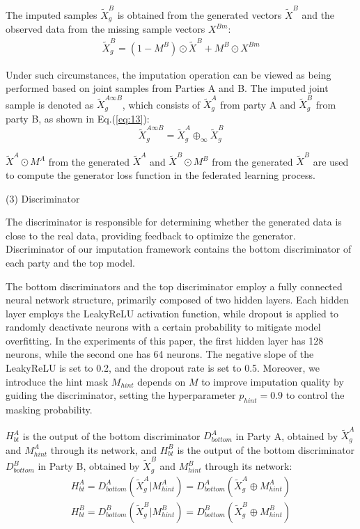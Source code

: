 \documentclass[final,1p,times]{elsarticle}
\begin{document}
The imputed samples $\tilde{X}_{g}^{B}$ is obtained from the generated vectors $\tilde{X}^B$  and the observed data from the missing sample vectors $X^{Bm}$:
\begin{equation}
	\begin{split}
	\tilde{X}_g^B=(1-M^B)\odot\tilde{X}^B+M^B\odot X^{Bm}
	\end{split}
\end{equation}

Under such circumstances, the imputation operation can be viewed as being performed based on joint samples from Parties A and B. The imputed joint sample is denoted as $\tilde{X}_{g}^{A\infty B}$, which consists of $\tilde{X}_g^A$ from party A and $\tilde{X}_g^B$ from party B, as shown in Eq.(\ref{eq:13}):
\begin{equation}
	\tilde{X}_g^{A\infty B}=\tilde{X}_g^A\oplus_\infty\tilde{X}_g^B
	\label{eq:13}
\end{equation}

$\tilde{X}^A\odot M^A$ from the generated $\tilde{X}^{A}$ and $\tilde{X}^B\odot M^B$ from the generated $\tilde{X}^{B}$ are used to compute the generator loss function in the federated learning process.

(3) Discriminator 

The discriminator is responsible for determining whether the generated data is close to the real data, providing feedback to optimize the generator. Discriminator of our imputation framework contains the bottom discriminator of each party and the top model. 

The bottom discriminators and the top discriminator employ a fully connected neural network structure, primarily composed of two hidden layers. Each hidden layer employs the LeakyReLU activation function, while dropout is applied to randomly deactivate neurons with a certain probability to mitigate model overfitting. In the experiments of this paper, the first hidden layer has 128 neurons, while the second one has 64 neurons. The negative slope of the LeakyReLU is set to 0.2, and the dropout rate is set to 0.5. Moreover, we introduce the hint mask $M_{hint}$ depends on $M$ to improve imputation quality by guiding the discriminator, setting the hyperparameter $p_{hint}=0.9$\cite{35} to control the masking probability.

$H_{bt}^A$ is the output of the bottom discriminator $D_{bottom}^{A}$ in Party A, obtained by $\tilde{X}_{g}^{A}$ and  $M_{hint}^A$ through its network, and $H_{bt}^{B}$ is the output of the bottom discriminator $D_{bottom}^{B}$ in Party B, obtained by $\tilde{X}_g^B$ and $M_{hint}^{B}$ through its network:
\begin{equation}
	\begin{split}
 H_{bt}^{A}=D_{bottom}^{A}\left(\tilde{X}_{g}^{A}|M_{hint}^{A}\right)=D_{bottom}^{A}\left(\tilde{X}_{g}^{A}\oplus M_{hint}^{A}\right)\\
 H_{bt}^{B}=D_{bottom}^{B}\left(\tilde{X}_{g}^{B}|M_{hint}^{B}\right)=D_{bottom}^{B}\left(\tilde{X}_{g}^{B}\oplus M_{hint}^{B}\right)
	\end{split}
\end{equation}
\end{document}
